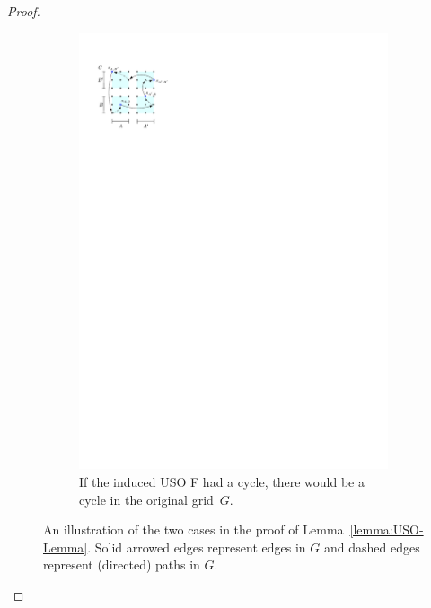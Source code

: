 \documentclass[runningheads,a4paper]{llncs}
\begin{document}
\begin{proof}
\begin{figure}
\begin{subfigure}[t]{0.47\textwidth}
\includegraphics{product_lemma_cycle.pdf}
\caption{\small If the induced USO F had a cycle, there would be a cycle in the original grid~$G$.}
\label{fig:InducedUSOcycle}
\end{subfigure}
\caption{An illustration of the two cases in the proof of Lemma~\ref{lemma:USO-Lemma}. Solid arrowed edges represent edges in $G$ and dashed edges represent (directed) paths in $G$.}
\label{fig:inducesUSOboth}
\end{figure}

\end{proof}
\end{document}
